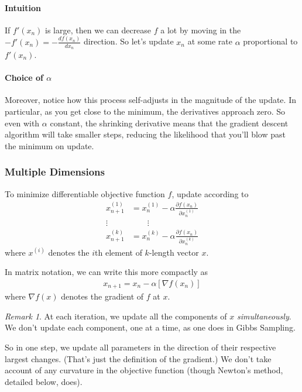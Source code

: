 \documentclass[a4paper,12pt]{scrartcl}
\theoremstyle{definition}
\theoremstyle{remark}
\newtheorem*{rmk}{Remark}
\begin{document}
\paragraph{Intuition}
If $f'(x_n)$ is large, then we can decrease $f$ a lot by moving in the
$-f'(x_n) = -\frac{df(x_n)}{dx_n}$ direction.  So let's update $x_n$ at
some rate $\alpha$ proportional to $f'(x_n)$.

\paragraph{Choice of $\alpha$}
Moreover, notice how this process self-adjusts in the
magnitude of the update.  In particular, as you get close to
the minimum, the derivatives approach zero.  So even with 
$\alpha$ constant, the shrinking derivative means that the gradient
descent algorithm will take smaller steps, reducing the likelihood that
you'll blow past the minimum on update.


\subsubsection{Multiple Dimensions}

To minimize differentiable objective function $f$, update according to
\begin{align*}
   x_{n+1}^{(1)} &= x_n^{(1)}
    - \alpha \frac{\partial f(x_n)}{\partial x_n^{(1)}}\\
   \vdots \quad & \qquad \vdots \\
   x_{n+1}^{(k)} &= x_n^{(k)}
    - \alpha \frac{\partial f(x_n)}{\partial x_n^{(k)}}
\end{align*}
where $x^{(i)}$ denotes the $i$th element of $k$-length vector $x$.

In matrix notation, we can write this more compactly as
\begin{align*}
  \label{eq:multigradesc}
  x_{n+1} = x_n - \alpha [\nabla f(x_n)]
\end{align*}
where $\nabla f(x)$ denotes the gradient of $f$ at $x$.

\begin{rmk}
At each iteration, we update all the components of $x$
\emph{simultaneously}.  We don't update each component, one at a time,
as one does in Gibbs Sampling.

So in one step, we update all parameters in the direction of their
respective largest changes. (That's just the definition of the
gradient.) We don't take account of any curvature in the objective
function (though Newton's method, detailed below, does).
\end{rmk}
\end{document}
